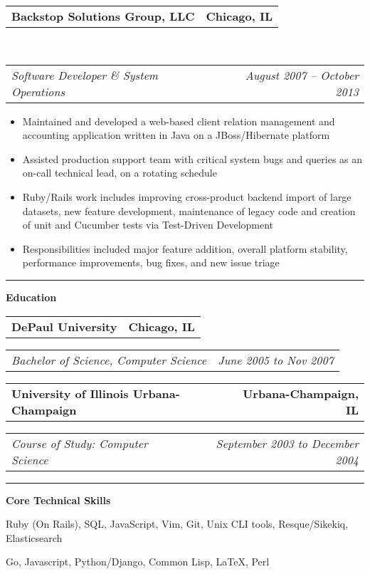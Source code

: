 \documentclass[10pt,letterpaper]{article}
\makeatletter
\newcommand{\headerrow}[2]
{\begin{tabular*}{\linewidth}{l@{\extracolsep{\fill}}r}
	#1 &
	#2 \\
\end{tabular*}}
\newenvironment{indentsection}[1]%
{\begin{list}{}%
	{\setlength{\leftmargin}{#1}}%
	\item[]%
}
{\end{list}}
\makeatother
\begin{document}
\begin{indentsection}{\parindent}
	\headerrow
		{\textbf{Backstop Solutions Group, LLC} }
		{\textbf{Chicago, IL}}
	\\
	\headerrow
		{\emph{Software Developer \& System Operations}}
		{\emph{August 2007 -- October 2013}}

	\begin{itemize}
	\renewcommand{\labelitemi}{$-$}
	\vspace{-0.1in}
		\item Maintained and developed a web-based client relation management and accounting application written in Java on a JBoss/Hibernate platform
		\item Assisted production support team with critical system bugs and queries as an on-call technical lead, on a rotating schedule
    \item Ruby/Rails work includes improving cross-product backend import of large datasets, new feature development, maintenance of legacy code and creation of unit and Cucumber tests via Test-Driven Development
    \item Responsibilities included major feature addition, overall platform stability, performance improvements, bug fixes, and new issue triage
	\end{itemize}
\end{indentsection}
\vspace{0.1in}
\hrule
\vspace{0.2in}
{\large \textbf{Education}}
\begin{indentsection}{\parindent}
	\headerrow
		{\textbf{DePaul University}}
		{\textbf{Chicago, IL}}
  \vspace{0.1in}
	\headerrow
		{\emph{Bachelor of Science, Computer Science}}
		{\emph{June 2005 to Nov 2007}}
  \headerrow
		{\textbf{University of Illinois Urbana-Champaign}}
		{\textbf{Urbana-Champaign, IL}}
  \headerrow
		{\emph{Course of Study: Computer Science}}
		{\emph{September 2003 to December 2004}}

\end{indentsection}
\vspace{0.1in}
\hrule
\vspace{0.2in}
{\large \textbf{Core Technical Skills}}
\begin{indentsection}{\parindent}
\begin{description}
	\item[Languages \& Tools]
  \item Ruby (On Rails), SQL, JavaScript, Vim, Git, Unix CLI tools, Resque/Sikekiq, Elasticsearch
	\item[Limited Experience]
	\item Go, Javascript, Python/Django, Common Lisp, \LaTeX, Perl
\end{description}
\end{indentsection}
\end{document}
